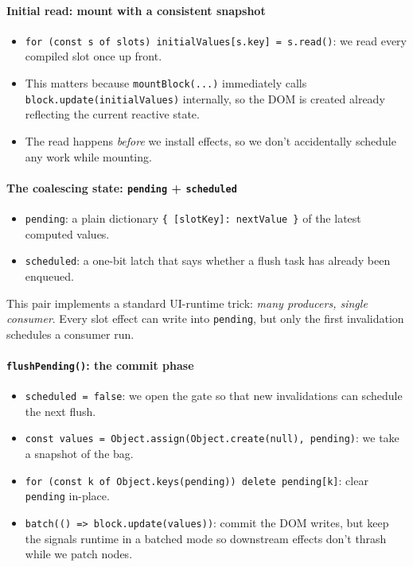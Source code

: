 \paragraph{Initial read: mount with a consistent snapshot}
\begin{itemize}
  \item \texttt{for (const s of slots) initialValues[s.key] = s.read()}: we read every compiled slot once up front.
  \item This matters because \texttt{mountBlock(...)} immediately calls \texttt{block.update(initialValues)} internally, so the DOM is created already reflecting the current reactive state.
  \item The read happens \emph{before} we install effects, so we don't accidentally schedule any work while mounting.
\end{itemize}

\paragraph{The coalescing state: \texttt{pending} + \texttt{scheduled}}
\begin{itemize}
  \item \texttt{pending}: a plain dictionary \texttt{\{ [slotKey]: nextValue \}} of the latest computed values.
  \item \texttt{scheduled}: a one-bit latch that says whether a flush task has already been enqueued.
\end{itemize}

This pair implements a standard UI-runtime trick: \emph{many producers, single consumer}. Every slot effect can write into \texttt{pending}, but only the first invalidation schedules a consumer run.

\paragraph{\texttt{flushPending()}: the commit phase}
\begin{itemize}
  \item \texttt{scheduled = false}: we open the gate so that new invalidations can schedule the next flush.
  \item \texttt{const values = Object.assign(Object.create(null), pending)}: we take a snapshot of the bag.
  \item \texttt{for (const k of Object.keys(pending)) delete pending[k]}: clear \texttt{pending} in-place.
  \item \texttt{batch(() => block.update(values))}: commit the DOM writes, but keep the signals runtime in a batched mode so downstream effects don't thrash while we patch nodes.
\end{itemize}

